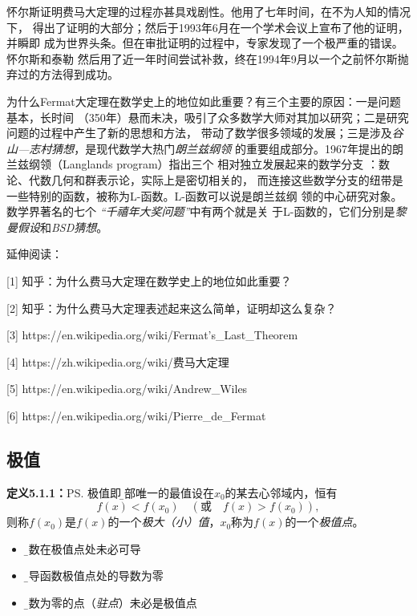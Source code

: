 \begin{shaded}
	怀尔斯证明费马大定理的过程亦甚具戏剧性。他用了七年时间，在不为人知的情况下，
	得出了证明的大部分；然后于1993年6月在一个学术会议上宣布了他的证明，并瞬即
	成为世界头条。但在审批证明的过程中，专家发现了一个极严重的错误。怀尔斯和泰勒
	然后用了近一年时间尝试补救，终在1994年9月以一个之前怀尔斯抛弃过的方法得到成功。
	
	为什么Fermat大定理在数学史上的地位如此重要？有三个主要的原因：一是问题基本，长时间
	（350年）悬而未决，吸引了众多数学大师对其加以研究；二是研究问题的过程中产生了新的思想和方法，
	带动了数学很多领域的发展；三是涉及{\it 谷山—志村猜想}，是现代数学大热门{\it 朗兰兹纲领}
	的重要组成部分。1967年提出的朗兰兹纲领（Langlands program）指出三个
	相对独立发展起来的数学分支	：数论、代数几何和群表示论，实际上是密切相关的，
	而连接这些数学分支的纽带是一些特别的函数，被称为L-函数。L-函数可以说是朗兰兹纲
	领的中心研究对象。数学界著名的七个	{\it “千禧年大奖问题”}中有两个就是关
	于L-函数的，它们分别是{\it 黎曼假设}和{\it BSD猜想}。
	
	延伸阅读：
	
	[1] 知乎：为什么费马大定理在数学史上的地位如此重要？
	
	[2] 知乎：为什么费马大定理表述起来这么简单，证明却这么复杂？
	
	[3] https://en.wikipedia.org/wiki/Fermat's\_Last\_Theorem
	
	[4] https://zh.wikipedia.org/wiki/费马大定理
	
	[5] https://en.wikipedia.org/wiki/Andrew\_Wiles
	
	[6] https://en.wikipedia.org/wiki/Pierre\_de\_Fermat
	
\end{shaded}

\subsection{极值}

{\bf 定义5.1.1：}\ps{极值即{\b 局部唯一的最值}}设在$x_0$的某去心邻域内，恒有
$$f(x)<f(x_0)\quad (\mbox{或}\quad f(x)>f(x_0)),$$
则称$f(x_0)$是$f(x)$的一个{\it 极大（小）值}，$x_0$称为$f(x)$的一个{\it 极值点}。

\begin{itemize}
  \setlength{\itemindent}{1cm}
  \item {\b 函数在极值点处未必可导} 
  \item {\b 可导函数极值点处的导数为零} 
  \item {\b 导数为零的点（{\it 驻点}）未必是极值点}
\end{itemize}


